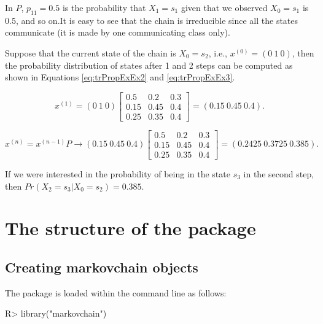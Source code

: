 \documentclass[
  nojss]{jss}
\begin{document}
In \(P\), \(p_{11}=0.5\) is the probability that \(X_{1}=s_{1}\) given that we observed \(X_{0}=s_{1}\) is 0.5, and so on.It is easy to see that the chain is irreducible since all the states communicate (it is made by one communicating class only).

Suppose that the current state of the chain is \(X_{0}=s_{2}\), i.e., \(x^{(0)}=(0\:1\:0)\), then the probability distribution of states after 1 and 2 steps can be computed as shown in Equations \eqref{eq:trPropExEx2} and \eqref{eq:trPropExEx3}.

\begin{equation}
x^{(1)}=\left(0\:1\:0\right)\left[\begin{array}{ccc}
0.5 & 0.2 & 0.3\\
0.15 & 0.45 & 0.4\\
0.25 & 0.35 & 0.4
\end{array}\right]=\left(0.15\:0.45\:0.4\right).
\label{eq:trPropExEx2}
\end{equation}

\begin{equation}
x^{(n)}=x^{(n-1)}P \to \left(0.15\:0.45\:0.4\right)\left[\begin{array}{ccc}
0.5 & 0.2 & 0.3\\
0.15 & 0.45 & 0.4\\
0.25 & 0.35 & 0.4
\end{array}\right]=\left(0.2425\:0.3725\:0.385\right).
\label{eq:trPropExEx3}
\end{equation}

If we were interested in the probability of being in the state \(s_{3}\) in the second step, then \(Pr\left(X_{2}=s_{3}\left|X_{0}=s_{2}\right.\right)=0.385\).

\newpage

\hypertarget{sec:structure}{%
\section{The structure of the package}\label{sec:structure}}

\hypertarget{creating-markovchain-objects}{%
\subsection{Creating markovchain objects}\label{creating-markovchain-objects}}

The package is loaded within the  command line as follows:

\begin{CodeChunk}

\begin{CodeInput}
R> library("markovchain")
\end{CodeInput}
\end{CodeChunk}
\end{document}
